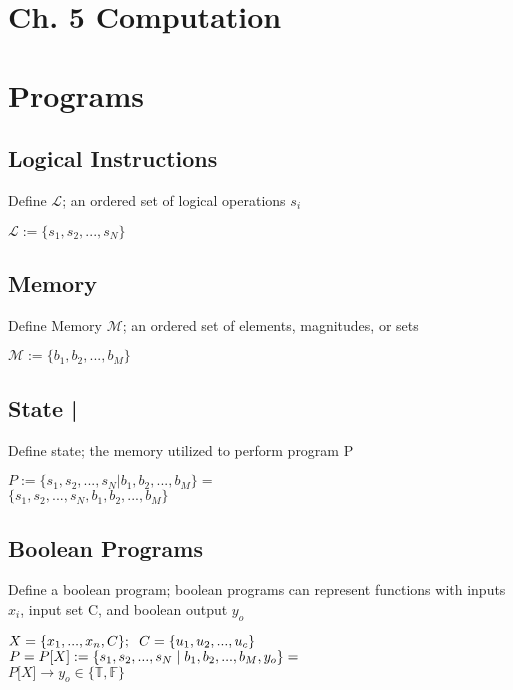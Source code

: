 \documentclass[11pt]{article}
\begin{document}
\section*{Ch. 5 Computation}





\section{Programs}
\subsection{Logical Instructions}
Define $\mathcal{L}$; an ordered set of logical operations $s_i$
\begin{center}
$
\mathcal{L} := \{ s_1,s_2,...,s_{N}\}
$
\end{center}





\subsection{Memory}
Define Memory $\mathcal{M}$; an ordered set of elements, magnitudes, or sets
\begin{center}
$\mathcal{M} := \{b_1,b_2,...,b_M\}$
\end{center}




\subsection{State |}
Define state; the memory utilized to perform program P
\begin{center}
$
P := \{ s_1, s_2,...,s_{N} | b_1, b_2,...,b_M\} =
$
\\ \vspace{2mm}
$
\{ s_1, s_2,...,s_{N}, b_1, b_2,...,b_M\}
$
\end{center}





\subsection{Boolean Programs}
Define a boolean program; boolean programs can represent functions with inputs $x_i$, input set C, and boolean output $y_o$
\begin{center}
$
X = \{x_1,...,x_n,C\}; \hspace{2mm} C = \{u_1,u_2,...,u_c\}
$
\\ \vspace{2mm}
$P = P\lbrack X \rbrack := \{ s_1,s_2,...,s_{N}\hspace{1mm}|\hspace{1mm} b_1, b_2,...,b_M,y_o\}=$
\\ \vspace{2mm}
$
P\lbrack X \rbrack \rightarrow y_o \in \{ \mathbb{T},\mathbb{F}\}
$
\end{center}
\end{document}

